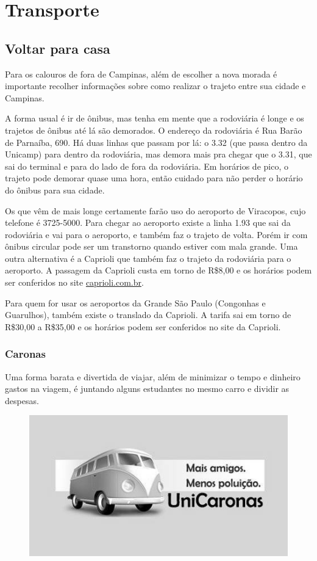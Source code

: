 
\section{Transporte}
\subsection{Voltar para casa}

Para os calouros de fora de Campinas, além de escolher a nova morada é
importante recolher informações sobre como realizar o trajeto entre sua cidade e
Campinas.

A forma usual é ir de ônibus, mas tenha em mente que a rodoviária é longe e os
trajetos de ônibus até lá são demorados. O endereço da rodoviária é Rua Barão de
Parnaíba, 690. Há duas linhas que passam por lá: o 3.32 (que passa dentro da
Unicamp) para dentro da rodoviária, mas demora mais pra chegar que o 3.31, que
sai do terminal e para do lado de fora da rodoviária. Em horários de pico, o
trajeto pode demorar quase uma hora, então cuidado para não perder o horário do
ônibus para sua cidade.

Os que vêm de mais longe certamente farão uso do aeroporto de Viracopos, cujo
telefone é 3725-5000. Para chegar ao aeroporto existe a linha 1.93 que sai da
rodoviária e vai para o aeroporto, e também faz o trajeto de volta. Porém ir com
ônibus circular pode ser um transtorno quando estiver com mala grande. Uma outra
alternativa é a Caprioli que também faz o trajeto da rodoviária para o
aeroporto. A passagem da Caprioli custa em torno de R\$8,00 e os horários podem
ser conferidos no site \url{caprioli.com.br}.

Para quem for usar os aeroportos da Grande São Paulo (Congonhas e Guarulhos),
também existe o translado da Caprioli. A tarifa sai em torno de R\$30,00 a
R\$35,00 e os horários podem ser conferidos no site da Caprioli.

\subsubsection*{Caronas}

Uma forma barata e divertida de viajar, além de minimizar o tempo e dinheiro
gastos na viagem, é juntando alguns estudantes no mesmo carro e dividir as
despesas.
\begin{figure}[h!]
    \centering
    \includegraphics[scale=0.55,keepaspectratio=true]{img/imgs/8-transporte/unicaronas.jpg}
\end{figure}

